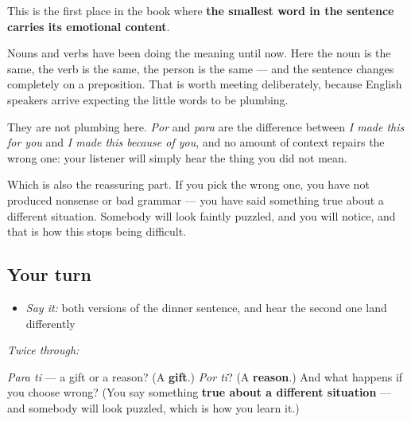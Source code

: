 \begin{grammarlens}[title={Grammar Lens: a preposition carrying the feeling}]
This is the first place in the book where \textbf{the smallest word in the sentence carries its emotional content}.

Nouns and verbs have been doing the meaning until now. Here the noun is the same, the verb is the same, the person is the same — and the sentence changes completely on a preposition. That is worth meeting deliberately, because English speakers arrive expecting the little words to be plumbing.

They are not plumbing here. \emph{Por} and \emph{para} are the difference between \emph{I made this for you} and \emph{I made this because of you}, and no amount of context repairs the wrong one: your listener will simply hear the thing you did not mean.

Which is also the reassuring part. If you pick the wrong one, you have not produced nonsense or bad grammar — you have said something true about a different situation. Somebody will look faintly puzzled, and you will notice, and that is how this stops being difficult.
\end{grammarlens}

\subsection*{Your turn}
\begin{itemize}
\raggedright
  \item \emph{Say it:} both versions of the dinner sentence, and hear the second one land differently
\end{itemize}

\emph{Twice through:}

\begin{tcolorbox}[breakable,colback=teal!4,colframe=teal!35!black,title={Before you move on}]
\emph{Para ti} — a gift or a reason? (A \textbf{gift}.) \emph{Por ti}? (A \textbf{reason}.) And what happens if you choose wrong? (You say something \textbf{true about a different situation} — and somebody will look puzzled, which is how you learn it.)
\end{tcolorbox}
